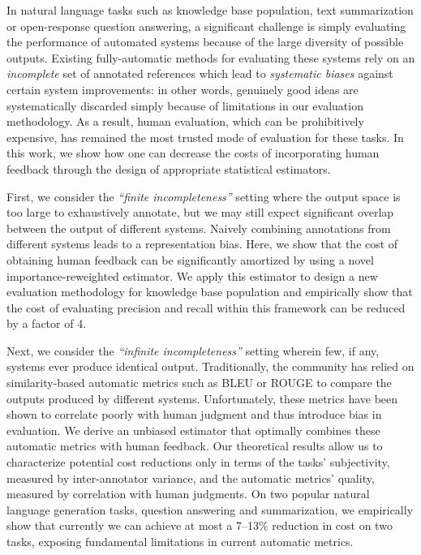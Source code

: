 In natural language tasks such as knowledge base population, text summarization or open-response question answering, a significant challenge is simply evaluating the performance of automated systems because of the large diversity of possible outputs.
Existing fully-automatic methods for evaluating these systems rely on an \textit{incomplete} set of annotated references which lead to \textit{systematic biases} against certain system improvements: in other words, genuinely good ideas are systematically discarded simply because of limitations in our evaluation methodology.
As a result, human evaluation, which can be prohibitively expensive, has remained the most trusted mode of evaluation for these tasks.
In this work, we show how one can decrease the costs of incorporating human feedback through the design of appropriate statistical estimators. 
%

First, we consider the \textit{``finite incompleteness''} setting where the output space is too large to exhaustively annotate, but we may still expect significant overlap between the output of different systems. 
Naively combining annotations from different systems leads to a representation bias.
Here, we show that the cost of obtaining human feedback can be significantly amortized by using a novel importance-reweighted estimator.  
We apply this estimator to design a new evaluation methodology for knowledge base population and empirically show that the cost of evaluating precision and recall within this framework can be reduced by a factor of 4.

Next, we consider the \textit{``infinite incompleteness''} setting wherein few, if any, systems ever produce identical output.
Traditionally, the community has relied on similarity-based automatic metrics such as BLEU or ROUGE to compare the outputs produced by different systems.
Unfortunately, these metrics have been shown to correlate poorly with human judgment and thus introduce bias in evaluation.
We derive an unbiased estimator that optimally combines these automatic metrics with human feedback.
Our theoretical results allow us to characterize potential cost reductions only in terms of the tasks' subjectivity, measured by inter-annotator variance, and the automatic metrics' quality, measured by correlation with human judgments.
On two popular natural language generation tasks, question answering and summarization, we empirically show that currently we can achieve at most a 7--13\% reduction in cost on two tasks, exposing fundamental limitations in  current automatic metrics.

